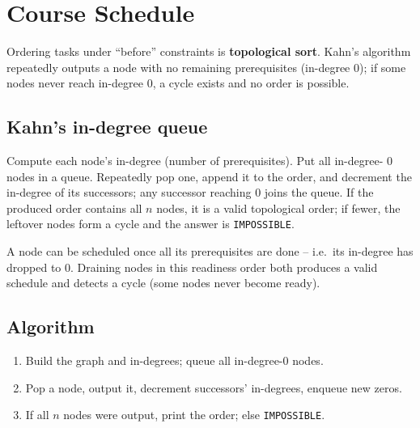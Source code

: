 \section{Course Schedule}
\label{sec:cses-course-schedule}


\begin{patternbox}
Ordering tasks under ``before'' constraints is \textbf{topological sort}.
Kahn's algorithm repeatedly outputs a node with no remaining prerequisites
(in-degree $0$); if some nodes never reach in-degree $0$, a cycle exists and
no order is possible.
\end{patternbox}

\subsection*{Kahn's in-degree queue}

Compute each node's in-degree (number of prerequisites). Put all in-degree-
$0$ nodes in a queue. Repeatedly pop one, append it to the order, and
decrement the in-degree of its successors; any successor reaching $0$ joins
the queue. If the produced order contains all $n$ nodes, it is a valid
topological order; if fewer, the leftover nodes form a cycle and the answer
is \texttt{IMPOSSIBLE}.

\begin{ideabox}
A node can be scheduled once all its prerequisites are done -- i.e.\ its
in-degree has dropped to $0$. Draining nodes in this readiness order both
produces a valid schedule and detects a cycle (some nodes never become
ready).
\end{ideabox}

\subsection*{Algorithm}

\begin{enumerate}
  \item Build the graph and in-degrees; queue all in-degree-$0$ nodes.
  \item Pop a node, output it, decrement successors' in-degrees, enqueue
        new zeros.
  \item If all $n$ nodes were output, print the order; else
        \texttt{IMPOSSIBLE}.
\end{enumerate}


